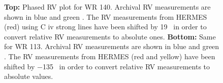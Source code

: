 \begin{figure}
    \centering
    \caption{\textbf{Top:} Phased RV plot for WR 140. Archival RV measurements are shown in blue \citep{fahed_spectroscopy_2011} and green \citep{thomas_orbit_2021}. The RV measurements from HERMES (red) using C iv strong lines have been shifted by 19~\kms{} in order to convert relative RV measurements to absolute ones. \textbf{Bottom:} Same for WR 113. Archival RV measurements are shown in blue \citep{hill_modelling_2018} and green \citep{massey_spectroscopic_1981}. The RV measurements from HERMES (red and yellow) have been shifted by $-$135~\kms{} in order to convert relative RV measurements to absolute values.}
    \label{fig:known_orbits}
\end{figure}

